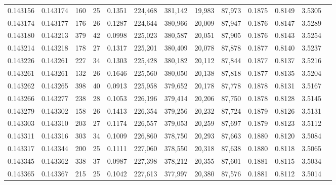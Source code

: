 \begin{tabular}{rrrrrrrrrrrrr}
0.143156 & 0.143174 &   160 &  25 &                                     0.1351 & 224,468 & 381,142 &  19,983 &  87,973 & 0.1875 & 0.8149 & 3.5305 \\
0.143174 & 0.143177 &   176 &  26 &                                     0.1287 & 224,644 & 380,966 &  20,009 &  87,947 & 0.1876 & 0.8147 & 3.5289 \\
0.143180 & 0.143213 &   379 &  42 &                                     0.0998 & 225,023 & 380,587 &  20,051 &  87,905 & 0.1876 & 0.8143 & 3.5254 \\
0.143214 & 0.143218 &   178 &  27 &                                     0.1317 & 225,201 & 380,409 &  20,078 &  87,878 & 0.1877 & 0.8140 & 3.5237 \\
0.143226 & 0.143261 &   227 &  34 &                                     0.1303 & 225,428 & 380,182 &  20,112 &  87,844 & 0.1877 & 0.8137 & 3.5216 \\
0.143261 & 0.143261 &   132 &  26 &                                     0.1646 & 225,560 & 380,050 &  20,138 &  87,818 & 0.1877 & 0.8135 & 3.5204 \\
0.143262 & 0.143265 &   398 &  40 &                                     0.0913 & 225,958 & 379,652 &  20,178 &  87,778 & 0.1878 & 0.8131 & 3.5167 \\
0.143266 & 0.143277 &   238 &  28 &                                     0.1053 & 226,196 & 379,414 &  20,206 &  87,750 & 0.1878 & 0.8128 & 3.5145 \\
0.143279 & 0.143302 &   158 &  26 &                                     0.1413 & 226,354 & 379,256 &  20,232 &  87,724 & 0.1879 & 0.8126 & 3.5131 \\
0.143303 & 0.143310 &   203 &  27 &                                     0.1174 & 226,557 & 379,053 &  20,259 &  87,697 & 0.1879 & 0.8123 & 3.5112 \\
0.143311 & 0.143316 &   303 &  34 &                                     0.1009 & 226,860 & 378,750 &  20,293 &  87,663 & 0.1880 & 0.8120 & 3.5084 \\
0.143317 & 0.143344 &   200 &  25 &                                     0.1111 & 227,060 & 378,550 &  20,318 &  87,638 & 0.1880 & 0.8118 & 3.5065 \\
0.143345 & 0.143362 &   338 &  37 &                                     0.0987 & 227,398 & 378,212 &  20,355 &  87,601 & 0.1881 & 0.8115 & 3.5034 \\
0.143365 & 0.143367 &   215 &  25 &                                     0.1042 & 227,613 & 377,997 &  20,380 &  87,576 & 0.1881 & 0.8112 & 3.5014 \\

\end{tabular}
